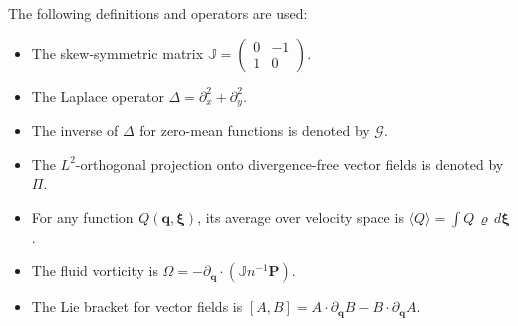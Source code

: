 \documentclass[10pt]{article}
\begin{document}
The following definitions and operators are used:
\begin{itemize}
    \item The skew-symmetric matrix $\mathbb{J} = \begin{pmatrix} 0 & -1\\ 1 & 0\end{pmatrix}$.
    \item The Laplace operator $\Delta = \partial_x^2 + \partial_y^2$.
    \item The inverse of $\Delta$ for zero-mean functions is denoted by $\mathcal{G}$.
    \item The $L^2$-orthogonal projection onto divergence-free vector fields is denoted by $\Pi$.
    \item For any function $Q(\bm{q},\bm{\xi})$, its average over velocity space is $\langle Q \rangle = \int Q\,\varrho\,d\bm{\xi}$.
    \item The fluid vorticity is $\Omega = -\partial_{\bm{q}}\cdot(\mathbb{J}n^{-1}\bm{P})$.
    \item The Lie bracket for vector fields is $[A,B] = A\cdot\partial_{\bm{q}}B - B\cdot\partial_{\bm{q}}A$.
\end{itemize}
\end{document}
